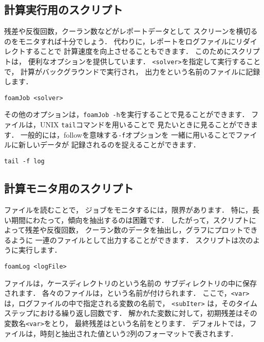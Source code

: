 \subsection{計算実行用のスクリプト}
\label{ssec:6.6.1}
%
%
残差や反復回数，クーラン数などがレポートデータとして
スクリーンを横切るのをモニタすれば十分でしょう．
代わりに，レポートをログファイルにリダイレクトすることで
計算速度を向上させることもできます．
このためにスクリプトは，
便利なオプションを提供しています．
\verb|<solver>|を指定して実行することで，
計算がバックグラウンドで実行され，
出力をという名前のファイルに記録します．
\begin{OFterminal}
\begin{verbatim}
foamJob <solver>
\end{verbatim}
\end{OFterminal}
その他のオプションは，\verb|foamJob -h|を実行することで見ることができます．
ファイルは，UNIX \texttt{tail}コマンドを用いることで
見たいときに見ることができます．
一般的には，followを意味する\verb|-f|オプションを
一緒に用いることでファイルに新しいデータが
記録されるのを捉えることができます．
\begin{OFterminal}
\begin{verbatim}
tail -f log
\end{verbatim}
\end{OFterminal}


\subsection{計算モニタ用のスクリプト}
\label{ssec:6.6.2}
%
%
ファイルを読むことで，
ジョブをモニタするには，限界があります．
特に，長い期間にわたって，傾向を抽出するのは困難です．
したがって，スクリプトによって残差や反復回数，
クーラン数のデータを抽出し，グラフにプロットできるように
一連のファイルとして出力することができます．
スクリプトは次のように実行します．
\begin{OFterminal}
\begin{verbatim}
foamLog <logFile>
\end{verbatim}
\end{OFterminal}
ファイルは，ケースディレクトリのという名前の
サブディレクトリの中に保存されます．
各々のファイルは，という名前が付けられます．
ここで，\texttt{<var>} は，ログファイルの中で指定される変数の名前で，
\texttt{<subIter>} は，そのタイムステップにおける繰り返し回数です．
解かれた変数に対して，初期残差はその変数名\texttt{<var>}をとり，
最終残差はという名前をとります．
デフォルトでは，ファイルは，時刻と抽出された値という2列のフォーマットで表されます．


